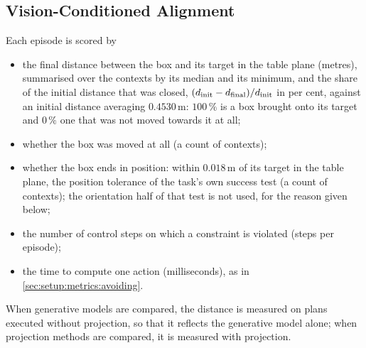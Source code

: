 
\subsection{Vision-Conditioned Alignment}\label{sec:setup:metrics:aligning}

Each episode is scored by
\begin{itemize}
  \item the final distance between the box and its target in the table plane (metres), summarised over the
    contexts by its median and its minimum, and the share of the initial distance that was closed,
    $(d_{\textrm{init}}-d_{\textrm{final}})/d_{\textrm{init}}$ in per cent, against an initial distance averaging
    $0.4530$\,m: $100\,\%$ is a box brought onto its target and $0\,\%$ one that was not moved towards it
    at all;
  \item whether the box was moved at all (a count of contexts);
  \item whether the box ends in position: within $0.018$\,m of its target in the table plane, the position
    tolerance of the task's own success test (a count of contexts); the orientation half of that test is not
    used, for the reason given below;
  \item the number of control steps on which a constraint is violated (steps per episode);
  \item the time to compute one action (milliseconds), as in \autoref{sec:setup:metrics:avoiding}.
\end{itemize}
When generative models are compared, the distance is measured on plans executed without projection, so
that it reflects the generative model alone; when projection methods are compared, it is measured with
projection.

